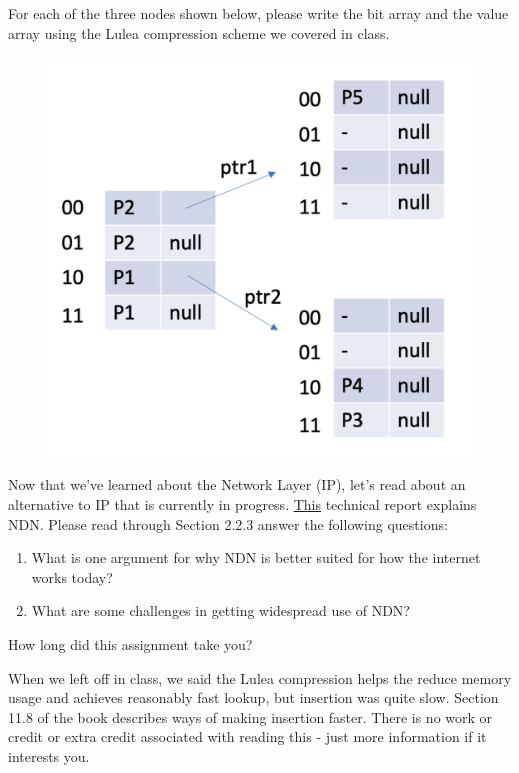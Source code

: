 \documentclass[10pt]{article}
\newenvironment{problem}[2][Problem]{\begin{trivlist}
\item[\hskip \labelsep {\bfseries #1}\hskip \labelsep {\bfseries #2.}]}{\end{trivlist}}
\begin{document}
\begin{problem} {2: Lulea Compression}

For each of the three nodes shown below, please write the bit array and the value array using the Lulea compression scheme we covered in class.

\begin{figure}[h]
    \centering
    \includegraphics[scale=0.5]{figures/trie_nodes.pdf}
    \label{fig:dvp}
\end{figure}

\end{problem}
\begin{problem}{3: Reading}
Now that we've learned about the Network Layer (IP), let's read about an alternative to IP that is currently in progress. \href{https://named-data.net/techreport/TR001ndn-proj.pdf}{This} technical report explains NDN. Please read through Section 2.2.3 answer the following questions:
\begin{enumerate}
    \item What is one argument for why NDN is better suited for how the internet works today?
    \item What are some challenges in getting widespread use of NDN?
\end{enumerate}
\end{problem}
\begin{problem}{4}
How long did this assignment take you?
\end{problem}
\begin{problem}{5: Extra (optional) reading}
When we left off in class, we said the Lulea compression helps the reduce memory usage and achieves reasonably fast lookup, but insertion was quite slow. Section 11.8 of the book describes ways of making insertion faster. There is no work or credit or extra credit associated with reading this - just more information if it interests you.
\end{problem}
\end{document}
